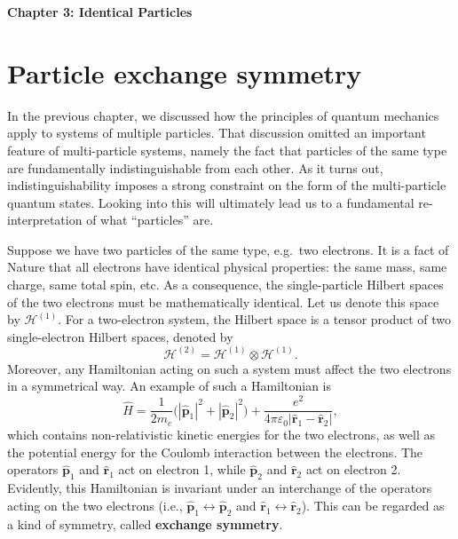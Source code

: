 \documentclass[pra,12pt]{revtex4}
\begin{document}
\begin{center}
{\Large \textbf{Chapter 3: Identical Particles}}
\end{center}

\section{Particle exchange symmetry}

In the previous chapter, we discussed how the principles of quantum
mechanics apply to systems of multiple particles.  That discussion
omitted an important feature of multi-particle systems, namely the
fact that particles of the same type are fundamentally
indistinguishable from each other.  As it turns out,
indistinguishability imposes a strong constraint on the form of the
multi-particle quantum states.  Looking into this will ultimately lead
us to a fundamental re-interpretation of what ``particles'' are.

Suppose we have two particles of the same type, e.g.~two electrons.
It is a fact of Nature that all electrons have identical physical
properties: the same mass, same charge, same total spin, etc.  As a
consequence, the single-particle Hilbert spaces of the two electrons
must be mathematically identical.  Let us denote this space by
$\mathscr{H}^{(1)}$.  For a two-electron system, the Hilbert space is
a tensor product of two single-electron Hilbert spaces, denoted by
$$\mathscr{H}^{(2)} = \mathscr{H}^{(1)} \otimes \mathscr{H}^{(1)}.$$
Moreover, any Hamiltonian acting on such a system must affect the two
electrons in a symmetrical way.  An example of such a Hamiltonian is
$$\hat{H} = \frac{1}{2m_e} \Big(|\hat{\mathbf{p}}_1|^2 + |\hat{\mathbf{p}}_2|^2\Big) + \frac{e^2}{4\pi\varepsilon_0|\hat{\mathbf{r}}_1 - \hat{\mathbf{r}}_2|},$$
which contains non-relativistic kinetic energies for the two
electrons, as well as the potential energy for the Coulomb interaction
between the electrons.  The operators $\hat{\mathbf{p}}_1$ and
$\hat{\mathbf{r}}_1$ act on electron 1, while $\hat{\mathbf{p}}_2$ and
$\hat{\mathbf{r}}_2$ act on electron 2.  Evidently, this Hamiltonian
is invariant under an interchange of the operators acting on the two
electrons (i.e., $\hat{\mathbf{p}}_1 \leftrightarrow
\hat{\mathbf{p}}_2$ and $\hat{\mathbf{r}}_1 \leftrightarrow
\hat{\mathbf{r}}_2$).  This can be regarded as a kind of symmetry,
called \textbf{exchange symmetry}.
\end{document}
